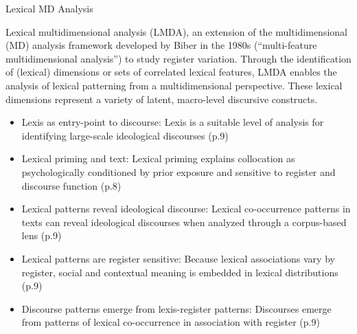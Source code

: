 \begin{frame}{Lexical MD Analysis}
    \scriptsize
    \vspace*{-4em}

    \begin{exampleblock}{\textcite[p.1]{berbersardinhaLexicalMultiDimensionalAnalysis2025}}
    Lexical multidimensional analysis (LMDA), an extension of the multidimensional (MD) analysis framework developed by Biber in the 1980s (``multi-feature multidimensional analysis'') to study register variation. Through the identification of (lexical) dimensions or sets of correlated lexical features, LMDA enables the analysis of lexical patterning from a multidimensional perspective. These lexical dimensions represent a variety of latent, macro-level discursive constructs.
    \end{exampleblock}

    \begin{itemize}
    \item Lexis as entry-point to discourse: Lexis is a suitable level of analysis for identifying large-scale ideological discourses (p.9)
    \item Lexical priming and text: Lexical priming \parencite{hoeyLexicalPrimingNew2007} explains collocation as psychologically conditioned by prior exposure and sensitive to register and discourse function (p.8)
    \item Lexical patterns reveal ideological discourse: Lexical co-occurrence patterns in texts can reveal ideological discourses when analyzed through a corpus-based lens (p.9)
    \item Lexical patterns are register sensitive: Because lexical associations vary by register, social and contextual meaning is embedded in lexical distributions (p.9)
    \item Discourse patterns emerge from lexis-register patterns: Discourses emerge from patterns of lexical co-occurrence in association with register (p.9)
    \end{itemize}
\end{frame}





